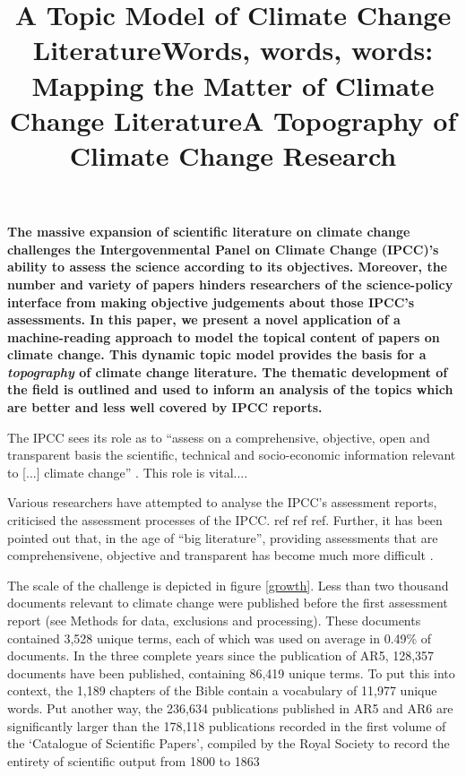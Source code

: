 \documentclass{article}
\title{A Topic Model of Climate Change Literature}
\title{Words, words, words: Mapping the Matter of Climate Change Literature}
\title{A Topography of Climate Change Research}
\begin{document}
\maketitle

\linenumbers

\textbf{
The massive expansion of scientific literature on climate change challenges the Intergovenmental Panel on Climate Change (IPCC)'s ability to assess the science according to its objectives. 
Moreover, the number and variety of papers hinders researchers of the science-policy interface from making objective judgements about those IPCC's assessments. In this paper, we present a novel application of a machine-reading approach to model the topical content of papers on climate change. This dynamic topic model provides the basis for a \textit{topography} of climate change literature. The thematic development of the field is outlined and used to inform an analysis of the topics which are better and less well covered by IPCC reports.
}


The IPCC sees its role as to ``assess on a comprehensive, objective, open and transparent basis the scientific, technical and socio-economic information relevant to [...] climate change'' \citep{IPCC2013}. This role is vital....

Various researchers have attempted to analyse the IPCC's assessment reports, criticised the assessment processes of the IPCC. ref ref ref. Further, it has been pointed out that, in the age of ``big literature'', providing assessments that are comprehensivene, objective and transparent has become much more difficult \citep{Minx2017l}. 

The scale of the challenge is depicted in figure \ref{growth}. Less than two thousand documents relevant to climate change were published before the first assessment report (see Methods for data, exclusions and processing). These documents contained 3,528 unique terms, each of which was used on average in 0.49\% of documents. In the three complete years since the publication of AR5, 128,357 documents have been published, containing 86,419 unique terms. To put this into context, the 1,189 chapters of the Bible contain a vocabulary of 11,977 unique words. Put another way, the 236,634 publications published in AR5 and AR6 are significantly larger than the 178,118 publications recorded in the first volume of the `Catalogue of Scientific Papers', compiled by the Royal Society to record the entirety of scientific output from 1800 to 1863 \citep{Csiszar2017}
\end{document}
